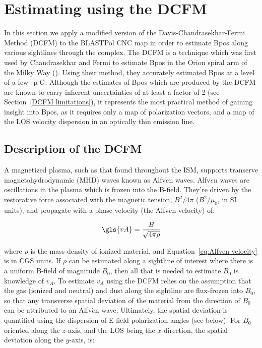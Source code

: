 \section{Estimating  using the DCFM}\label{DCFM}

In this section we apply a modified version of the Davis-Chandrasekhar-Fermi Method (DCFM) to the BLASTPol CNC map in order to estimate \gls{Bpos} along various sightlines through the complex. The DCFM is a technique which was first used by Chandrasekhar and Fermi to estimate \gls{Bpos} in the Orion spiral arm of the Milky Way (\citet{davis1951strength,chandrasekhar1953magnetic}). Using their method, they accurately estimated \gls{Bpos} at a level of a few~$\upmu$G. Although the estimates of \gls{Bpos} which are produced by the DCFM are known to carry inherent uncertainties of at least a factor of 2 (see Section~\ref{DCFM limitations}), it represents the most practical method of gaining insight into \gls{Bpos}, as it requires only a map of polarization vectors, and a map of the LOS velocity dispersion in an optically thin emission line.

\subsection{Description of the DCFM}

A magnetized plasma, such as that found throughout the ISM, supports transerve magnetohydrodynamic (MHD) waves known as Alfv$\acute{e}$n waves. Alfv$\acute{e}$n waves are  oscillations in the plasma which is frozen into the B-field. They're driven by the restorative force associated with the magnetic tension, $B^{2}/4\pi$ ($B^{2}/\mu_{0}$, in SI units), and propagate with a phase velocity (the Alfv$\acute{e}$n velocity) of:

\begin{equation}\label{eq:Alfven velocity}
  \gls{vA} = \frac{B}{\sqrt{4 \pi \rho}}
\end{equation}

where $\rho$ is the mass density of ionized material, and Equation~\ref{eq:Alfven velocity} is in CGS units. If $\rho$ can be estimated along a sightline of interest where there is a uniform B-field of magnitude $B_{0}$, then all that is needed to estimate $B_{0}$ is knowledge of $v_{A}$. To estimate $v_{A}$ using the DCFM relies on the assumption that the gas (ionized and neutral) and dust along the sightline are flux-frozen into $B_{0}$, so that any transverse spatial deviation of the material from the direction of $B_{0}$ can be attributed to an Alfv$\acute{e}$n wave. Ultimately, the spatial deviation is quantified using the dispersion of E-field polarization angles (see below). For $B_{0}$ oriented along the $z$-axis, and the LOS being the $x$-direction, the spatial deviation along the $y$-axis, is:

